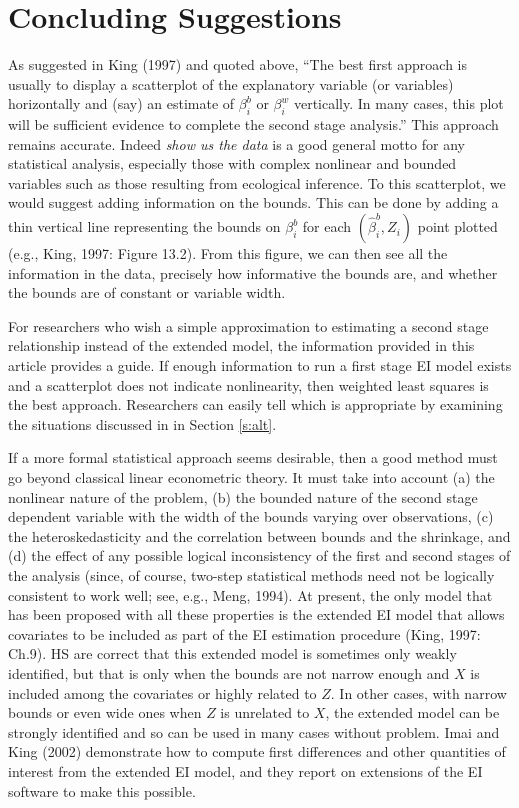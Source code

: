 \documentclass[11pt,titlepage]{article}
\begin{document}
\section{Concluding Suggestions}

As suggested in King (1997) and quoted above, ``The best first
approach is usually to display a scatterplot of the explanatory
variable (or variables) horizontally and (say) an estimate of
$\beta_i^b$ or $\beta_i^w$ vertically.  In many cases, this plot will
be sufficient evidence to complete the second stage analysis.''  This
approach remains accurate.  Indeed \emph{show us the data} is a good
general motto for any statistical analysis, especially those with
complex nonlinear and bounded variables such as those resulting from
ecological inference.  To this scatterplot, we would suggest adding
information on the bounds.  This can be done by adding a thin vertical
line representing the bounds on $\beta_i^b$ for each
$(\hat\beta_i^b,Z_i)$ point plotted (e.g., King, 1997: Figure 13.2).
From this figure, we can then see all the information in the data,
precisely how informative the bounds are, and whether the bounds are
of constant or variable width.

For researchers who wish a simple approximation to estimating a second
stage relationship instead of the extended model, the information
provided in this article provides a guide.  If enough information to
run a first stage EI model exists and a scatterplot does not indicate
nonlinearity, then weighted least squares is the best approach.
Researchers can easily tell which is appropriate by examining the
situations discussed in in Section \ref{s:alt}.

If a more formal statistical approach seems desirable, then a good
method must go beyond classical linear econometric theory.  It must
take into account (a) the nonlinear nature of the problem, (b) the
bounded nature of the second stage dependent variable with the width
of the bounds varying over observations, (c) the heteroskedasticity
and the correlation between bounds and the shrinkage, and (d) the
effect of any possible logical inconsistency of the first and second
stages of the analysis (since, of course, two-step statistical methods
need not be logically consistent to work well; see, e.g., Meng, 1994).
At present, the only model that has been proposed with all these
properties is the extended EI model that allows covariates to be
included as part of the EI estimation procedure (King, 1997: Ch.9).
HS are correct that this extended model is sometimes only weakly
identified, but that is only when the bounds are not narrow enough and
$X$ is included among the covariates or highly related to $Z$.  In
other cases, with narrow bounds or even wide ones when $Z$ is
unrelated to $X$, the extended model can be strongly identified and so
can be used in many cases without problem.  Imai and King (2002)
demonstrate how to compute first differences and other quantities of
interest from the extended EI model, and they report on extensions of
the EI software to make this possible.
\end{document}
